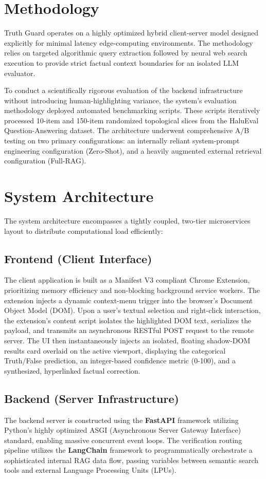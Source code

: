 \documentclass[conference]{IEEEtran}
\begin{document}
\section{Methodology}
Truth Guard operates on a highly optimized hybrid client-server model designed explicitly for minimal latency edge-computing environments. The methodology relies on targeted algorithmic query extraction followed by neural web search execution to provide strict factual context boundaries for an isolated LLM evaluator. 

To conduct a scientifically rigorous evaluation of the backend infrastructure without introducing human-highlighting variance, the system's evaluation methodology deployed automated benchmarking scripts. These scripts iteratively processed 10-item and 150-item randomized topological slices from the HaluEval Question-Answering dataset. The architecture underwent comprehensive A/B testing on two primary configurations: an internally reliant system-prompt engineering configuration (Zero-Shot), and a heavily augmented external retrieval configuration (Full-RAG). 

\section{System Architecture}
The system architecture encompasses a tightly coupled, two-tier microservices layout to distribute computational load efficiently:

\subsection{Frontend (Client Interface)}
The client application is built as a Manifest V3 compliant Chrome Extension, prioritizing memory efficiency and non-blocking background service workers. The extension injects a dynamic context-menu trigger into the browser's Document Object Model (DOM). Upon a user's textual selection and right-click interaction, the extension's content script isolates the highlighted DOM text, serializes the payload, and transmits an asynchronous RESTful POST request to the remote server. The UI then instantaneously injects an isolated, floating shadow-DOM results card overlaid on the active viewport, displaying the categorical Truth/False prediction, an integer-based confidence metric (0-100), and a synthesized, hyperlinked factual correction.

\subsection{Backend (Server Infrastructure)}
The backend server is constructed using the \textbf{FastAPI} framework utilizing Python's highly optimized ASGI (Asynchronous Server Gateway Interface) standard, enabling massive concurrent event loops. The verification routing pipeline utilizes the \textbf{LangChain} framework to programmatically orchestrate a sophisticated internal RAG data flow, passing variables between semantic search tools and external Language Processing Units (LPUs).
\end{document}
